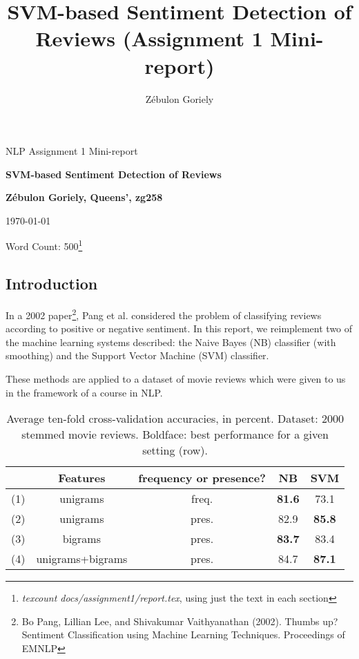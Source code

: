 \documentclass[12pt]{article}
\title{\bf{SVM-based Sentiment Detection of Reviews (Assignment 1 Mini-report)}}
\author{\Large{Z\'ebulon Goriely}}
\begin{document}
\centerline{\large NLP Assignment 1 Mini-report}
\vspace{0.2in}
\centerline{\Large\bf SVM-based Sentiment Detection of Reviews}
\vspace{0.2in}
\centerline{\large {\bf{Z\'ebulon Goriely, Queens', zg258}}}
\vspace{0.2in}
\centerline{\large {\today}}
\vspace{0.1in}
\centerline{Word Count: 500\footnote{\emph{texcount docs/assignment1/report.tex}, using just the text in each section}}
\vspace{0.2in}

\begin{multicols}{2}

\section{Introduction}

In a 2002 paper\footnote{Bo Pang, Lillian Lee, and Shivakumar Vaithyanathan (2002). Thumbs up? Sentiment Classification using Machine Learning Techniques. Proceedings of EMNLP}, Pang et al. considered the problem of classifying reviews according to positive or negative sentiment. In this report, we reimplement two of the machine learning systems described: the Naive Bayes (NB) classifier (with smoothing) and the Support Vector Machine (SVM) classifier.

These methods are applied to a dataset of movie reviews which were given to us in the framework of a course in NLP.

\begin{table*}[t]
\centering
 \begin{tabular}{| c | c | c ||c|c|} 
 \hline
   & Features & frequency or presence? & NB & SVM\\ [0.5ex] 
 \hline\hline
 (1) & unigrams & freq. & \bf{81.6} & 73.1\\ 
 \hline
 (2) & unigrams & pres. & 82.9 & \bf{85.8}\\
 \hline
 (3) & bigrams & pres. & \bf{83.7} & 83.4 \\
 \hline
 (4) & unigrams+bigrams & pres. & 84.7 & \bf{87.1} \\
 \hline
\end{tabular}
\caption{Average ten-fold cross-validation accuracies, in percent. Dataset: 2000 stemmed movie reviews. Boldface: best performance for a given setting (row).} \label{table:accuracies}
\end{table*}


\end{multicols}
\end{document}
